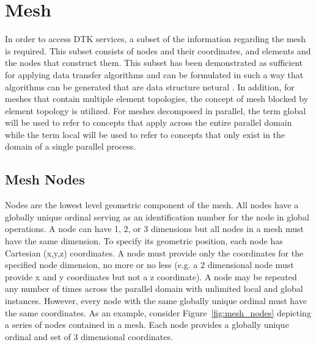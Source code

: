 \documentclass[letterpaper,12pt]{article}
\begin{document}
\clearpage

\section{Mesh}\label{sec:mesh}
In order to access DTK services, a subset of the information regarding
the mesh is required. This subset consists of nodes and their
coordinates, and elements and the nodes that construct them. This
subset has been demonstrated as sufficient for applying data transfer
algorithms \cite{Stewart_2004} and can be formulated in such a way
that algorithms can be generated that are data structure netural
\cite{Chand_2008}. In addition, for meshes that contain multiple
element topologies, the concept of mesh blocked by element topology is
utilized. For meshes decomposed in parallel, the term global will be
used to refer to concepts that apply across the entire parallel domain
while the term local will be used to refer to concepts that only exist
in the domain of a single parallel process. 

\subsection{Mesh Nodes}\label{subsec:nodes}
Nodes are the lowest level geometric component of the mesh. All nodes
have a globally unique ordinal serving as an identification number for
the node in global operations. A node can have 1, 2, or 3 dimensions
but all nodes in a mesh must have the same dimension. To specify its
geometric position, each node has Cartesian (x,y,z) coordinates. A
node must provide only the coordinates for the specified node
dimension, no more or no less (e.g. a 2 dimensional node must provide
x and y coordinates but not a z coordinate). A node may be repeated
any number of times across the parallel domain with unlimited local
and global instances. However, every node with the same globally
unique ordinal must have the same coordinates. As an example, consider
Figure~\ref{fig:mesh_nodes} depicting a series of nodes contained in
a mesh. Each node provides a globally unique ordinal and set of 3
dimensional coordinates.
\end{document}

